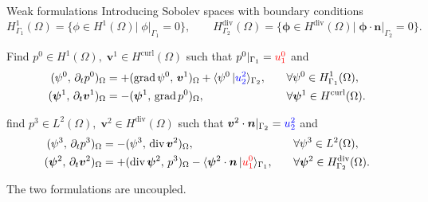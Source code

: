 \documentclass[aspectratio=169]{beamer}
\DeclareMathOperator*{\grad}{grad}
\renewcommand{\div}{\operatorname{div}}
\DeclareMathOperator*{\curl}{curl}
\newcommand{\inpr}[3][]{\ensuremath{( #2, \, #3 )_{#1}}}
\newcommand{\dualpr}[3][]{\ensuremath{\langle #2 \, \vert #3 \rangle_{#1}}}
\begin{document}
\begin{frame}{Weak formulations}
Introducing Sobolev spaces with boundary conditions	
\begin{equation*}
		H^1_{\Gamma_1}(\Omega) = \{\phi \in H^1(\Omega) |\; \phi|_{\Gamma_1} = 0\}, \qquad
		H^{\div}_{\Gamma_2}(\Omega) = \{\bm{\phi} \in H^{\div}(\Omega) |\; \bm{\phi} \cdot \bm{n}|_{\Gamma_2} = 0\}.
\end{equation*}


\begin{tcolorbox}[nobeforeafter, colframe=theme,title=Primal weak formulation]%
Find $p^0 \in H^1(\Omega), \; \bm{v}^1 \in H^{\curl}(\Omega)$ such that $p^0|_{\Gamma_1} = \textcolor{red}{u^0_1}$ and
\begin{equation*}
	\begin{aligned}
		\inpr[\Omega]{\psi^0}{\partial_t p^0} &= +\inpr[\Omega]{\grad \psi^0}{\bm{v}^1} + \dualpr[\Gamma_2]{\psi^0}{\textcolor{blue}{u^2_2}}, \\
		\inpr[\Omega]{\bm{\psi}^1}{\partial_t \bm{v}^1} &= -\inpr[\Omega]{\bm{\psi}^1}{\grad {p}^0},
	\end{aligned} \qquad
	\begin{aligned}
		&\forall \psi^0 \in H^1_{\Gamma_1}(\Omega), \\
		&\forall \bm{\psi}^1 \in H^{\curl}(\Omega).
	\end{aligned}
\end{equation*}
\end{tcolorbox} 

\begin{tcolorbox}[nobeforeafter, colframe=theme,title=Dual weak formulation]%
find $p^3 \in L^2(\Omega), \; \bm{v}^2 \in H^{\div}(\Omega)$ such that $\bm{v}^2 \cdot \bm{n}|_{\Gamma_2} = \textcolor{blue}{u^2_2}$ and
\begin{equation*}
	\begin{aligned}
		\inpr[\Omega]{\psi^3}{\partial_t p^3} &= -\inpr[\Omega]{\psi^3}{\div\bm{v}^2}, \\
		\inpr[\Omega]{\bm{\psi}^2}{\partial_t \bm{v}^2} &= +\inpr[\Omega]{\div \bm{\psi}^2}{p^3} - \dualpr[\Gamma_1]{\bm{\psi}^2 \cdot \bm{n}}{\textcolor{red}{u^0_1}},
	\end{aligned} \qquad
	\begin{aligned}
		&\forall \psi^3 \in L^2(\Omega), \\
		&\forall \bm{\psi}^2 \in H^{\div}_{\Gamma_2}(\Omega).
	\end{aligned}
\end{equation*}
\end{tcolorbox} 
The two formulations are uncoupled.
\end{frame}
\end{document}
